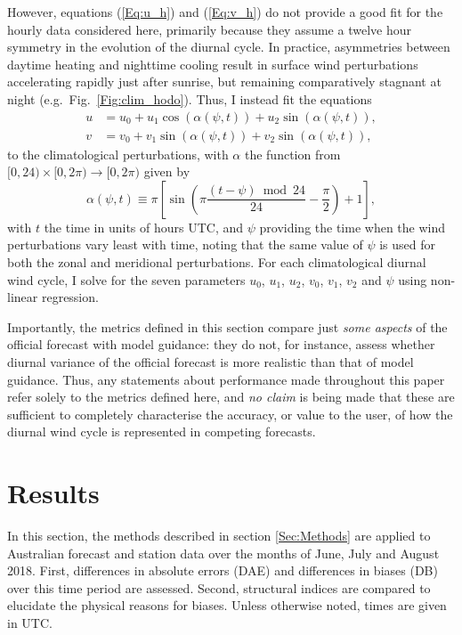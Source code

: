 \documentclass[twocol]{ametsoc}
\begin{document}
However, equations (\ref{Eq:u_h}) and (\ref{Eq:v_h}) do not provide a good fit for the hourly data considered here, primarily because they assume a twelve hour symmetry in the evolution of the diurnal cycle. In practice, asymmetries between daytime heating and nighttime cooling \citep[e.g.][]{svensson11} result in surface wind perturbations accelerating rapidly just after sunrise, but remaining comparatively stagnant at night (e.g.~Fig.~\ref{Fig:clim_hodo}). Thus, I instead fit the equations
\begin{align}
u &= u_0 + u_1 \cos(\alpha(\psi,t)) + u_2 \sin(\alpha(\psi,t)), \label{Eq:u} \\
v &= v_0 + v_1 \sin(\alpha(\psi,t)) + v_2 \sin(\alpha(\psi,t)), \label{Eq:v}
\end{align}
to the climatological perturbations, with $\alpha$ the function from $[0,24) \times [0, 2\pi) \to [0, 2\pi)$ given by
\begin{equation}
\alpha(\psi,t) \equiv \pi \left[\sin\left( \pi \frac{(t - \psi)  \bmod 24}{24} - \frac{\pi}{2} \right) + 1 \right], \label{Eq:alpha}
\end{equation}
with $t$ the time in units of hours UTC, and $\psi$ providing the time when the wind perturbations vary least with time, noting that the same value of $\psi$ is used for both the zonal and meridional perturbations. For each climatological diurnal wind cycle, I solve for the seven parameters $u_0$, $u_1$, $u_2$, $v_0$, $v_1$, $v_2$ and $\psi$ using non-linear regression.

Importantly, the metrics defined in this section compare just \textit{some aspects} of the official forecast with model guidance: they do not, for instance, assess whether diurnal variance of the official forecast is more realistic than that of model guidance. Thus, any statements about performance made throughout this paper refer solely to the metrics defined here, and \textit{no claim} is being made that these are sufficient to completely characterise the accuracy, or value to the user, of how the diurnal wind cycle is represented in competing forecasts.

\section{Results}
\label{Sec:Results}
In this section, the methods described in section \ref{Sec:Methods} are applied to Australian forecast and station data over the months of June, July and August 2018. First, differences in absolute errors (DAE) and differences in biases (DB) over this time period are assessed. Second, structural indices are compared to elucidate the physical reasons for biases. Unless otherwise noted, times are given in UTC.
\end{document}
